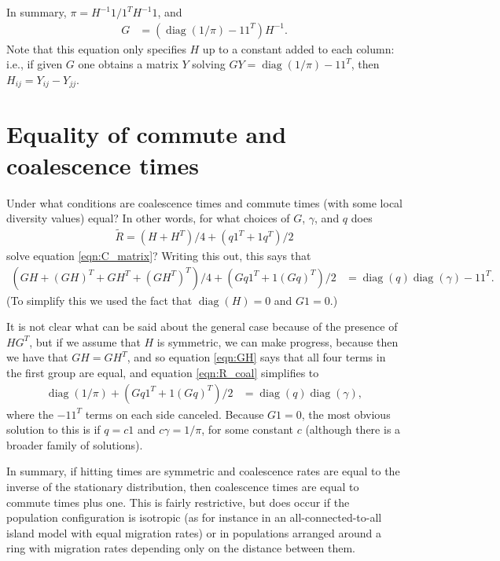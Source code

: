 \documentclass{article}
\newcommand{\comdist}{\widetilde{R}}
\DeclareMathOperator{\diag}{\mathop{\mbox{diag}}}
\begin{document}
In summary, $\pi = H^{-1} 1 / 1^T H^{-1} 1$, and 
\begin{align}
    G 
    &= (\diag(1/\pi) - 1 1^T) H^{-1} .
\end{align}
Note that this equation only specifies $H$ up to a constant added to each column:
i.e., if given $G$ one obtains a matrix $Y$ solving $GY = \diag(1/\pi) - 1 1^T$,
then $H_{ij} = Y_{ij} - Y_{jj}$.


\section{Equality of commute and coalescence times}
\label{sec:com_eq_coal}

Under what conditions are coalescence times and commute times (with some local diversity values) equal?
In other words, for what choices of $G$, $\gamma$, and $q$ does
\begin{align}
    \comdist = (H + H^T)/4 + (q 1^T + 1 q^T)/2
\end{align}
solve equation \eqref{eqn:C_matrix}?
Writing this out, this says that
\begin{align} \label{eqn:R_coal}
    ( GH + (GH)^T + GH^T + (GH^T)^T )/4 + (Gq 1^T + 1 (Gq)^T)/2
    &=
    \diag(q) \diag(\gamma) - 1 1^T .
\end{align}
(To simplify this we used the fact that $\diag(H) = 0$ and $G1 = 0$.)

It is not clear what can be said about the general case because of the presence of $HG^T$,
but if we assume that $H$ is symmetric, we can make progress,
because then we have that $GH = GH^T$, 
and so equation \eqref{eqn:GH} says that all four terms in the first group are equal,
and equation \eqref{eqn:R_coal} simplifies to
\begin{align} \label{eqn:R_eq_C}
    \diag(1/\pi) + (Gq 1^T + 1 (Gq)^T)/2
    &=
    \diag(q) \diag(\gamma) ,
\end{align}
where the $-1 1^T$ terms on each side canceled.
Because $G1=0$,
the most obvious solution to this is if $q = c 1$ and $c \gamma = 1/\pi$, for some constant $c$
(although there is a broader family of solutions).

In summary, if hitting times are symmetric
and coalescence rates are equal to the inverse of the stationary distribution,
then coalescence times are equal to commute times plus one.
This is fairly restrictive, 
but does occur if the population configuration is isotropic
(as for instance in an all-connected-to-all island model with equal migration rates)
or in populations arranged around a ring
with migration rates depending only on the distance between them.
\end{document}
